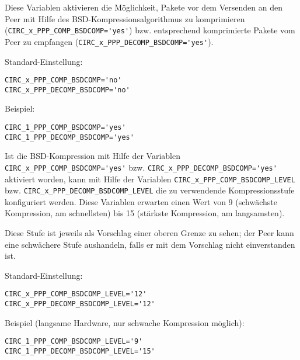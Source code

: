 \begin{description}


Diese Variablen aktivieren die Möglichkeit, Pakete vor dem Versenden an den Peer
mit Hilfe des BSD-Kompressionsalgorithmus zu komprimieren
(\verb+CIRC_x_PPP_COMP_BSDCOMP='yes'+) bzw. entsprechend komprimierte Pakete
vom Peer zu empfangen (\verb+CIRC_x_PPP_DECOMP_BSDCOMP='yes'+).

Standard-Einstellung:

\verb+CIRC_x_PPP_COMP_BSDCOMP='no'+\\
\verb+CIRC_x_PPP_DECOMP_BSDCOMP='no'+

Beispiel:

\verb+CIRC_1_PPP_COMP_BSDCOMP='yes'+\\
\verb+CIRC_1_PPP_DECOMP_BSDCOMP='yes'+


Ist die BSD-Kompression mit Hilfe der Variablen
\verb+CIRC_x_PPP_COMP_BSDCOMP='yes'+ bzw. \verb+CIRC_x_PPP_DECOMP_BSDCOMP='yes'+
aktiviert worden, kann mit Hilfe der Variablen
\verb+CIRC_x_PPP_COMP_BSDCOMP_LEVEL+ bzw. \verb+CIRC_x_PPP_DECOMP_BSDCOMP_LEVEL+
die zu verwendende Kompressionsstufe konfiguriert werden. Diese Variablen
erwarten einen Wert von 9 (schwächste Kompression, am schnellsten) bis 15
(stärkste Kompression, am langsamsten).

Diese Stufe ist jeweils als Vorschlag einer oberen Grenze zu sehen; der Peer
kann eine schwächere Stufe aushandeln, falls er mit dem Vorschlag nicht
einverstanden ist.

Standard-Einstellung:

\verb+CIRC_x_PPP_COMP_BSDCOMP_LEVEL='12'+\\
\verb+CIRC_x_PPP_DECOMP_BSDCOMP_LEVEL='12'+

Beispiel (langsame Hardware, nur schwache Kompression möglich):

\verb+CIRC_1_PPP_COMP_BSDCOMP_LEVEL='9'+\\
\verb+CIRC_1_PPP_DECOMP_BSDCOMP_LEVEL='15'+



\end{description}
